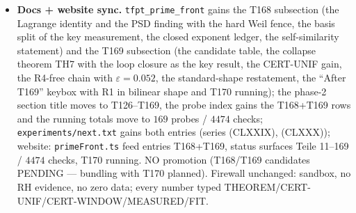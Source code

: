 \documentclass[11pt]{article}
\begin{document}
\begin{itemize}[leftmargin=1.5em]
$L_P$ exact (the $t^*$-recipe is a near-degeneracy artefact --- its tightness
\emph{measures} $\det\hat A$), scramble $8/8$, flat-weight null $8/8$,
parity-pair control only $6.7\times$ (honestly PARTIAL). Balance
\textbf{$10$ THEOREM / $2$ CERT-UNIF / $1$ CERT-WINDOW / $4$ NO-GO}. The rest:
\textbf{R1, for the first time in standard analytic shape --- an $m$-free
bound on $\det\hat A$ at $h^{-3+\varepsilon}$ as a bilinear von Mangoldt sum
against closed Dirichlet weights} (equivalently the diagonal ratio to
$1.2\times10^{-2}/5.6\times10^{-4}$); R2 $=$ R1; R3 closed; R4 not needed.
T170 (\texttt{bilinear\_sieve\_probe.py}, contract \texttt{BILINEAR.SIEVE})
is running the unconditional sieve toolbox (Montgomery--Vaughan, Vaughan
decomposition) on the bilinear form --- T161's beyond-RH triage applied to
\emph{linear} sums; for \emph{bilinear} forms the large sieve gives
unconditional square-root cancellation.
\item \textbf{Docs + website sync.} \texttt{tfpt\_prime\_front} gains the T168
subsection (the Lagrange identity and the PSD finding with the hard Weil
fence, the basis split of the key measurement, the closed exponent ledger,
the self-similarity statement) and the T169 subsection (the candidate table,
the collapse theorem TH7 with the loop closure as the key result, the
CERT-UNIF gain, the R4-free chain with $\varepsilon=0.052$, the
standard-shape restatement, the ``After T169'' keybox with R1 in bilinear
shape and T170 running); the phase-2 section title moves to T126--T169, the
probe index gains the T168+T169 rows and the running totals move to $169$
probes / $4474$ checks; \texttt{experiments/next.txt} gains both entries
(series (CLXXIX), (CLXXX)); website: \texttt{primeFront.ts} feed entries
T168+T169, status surfaces Teile 11--169 / $4474$ checks, T170 running. NO
promotion (T168/T169 candidates PENDING --- bundling with T170 planned).
Firewall unchanged: sandbox, no RH evidence, no zero data; every number typed
THEOREM/CERT-UNIF/CERT-WINDOW/MEASURED/FIT.
\end{itemize}
\end{document}
